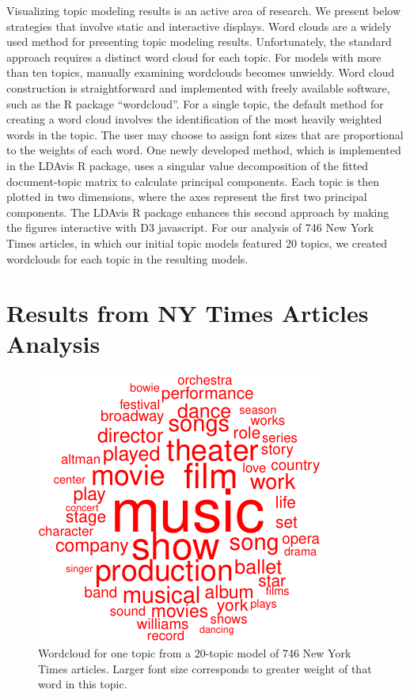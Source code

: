\documentclass[12pt,]{article}
\begin{document}
Visualizing topic modeling results is an active area of research. We
present below strategies that involve static and interactive displays.
Word clouds are a widely used method for presenting topic modeling
results. Unfortunately, the standard approach requires a distinct word
cloud for each topic. For models with more than ten topics, manually
examining wordclouds becomes unwieldy. Word cloud construction is
straightforward and implemented with freely available software, such as
the R package ``wordcloud''. For a single topic, the default method for
creating a word cloud involves the identification of the most heavily
weighted words in the topic. The user may choose to assign font sizes
that are proportional to the weights of each word. One newly developed
method, which is implemented in the LDAvis R package, uses a singular
value decomposition of the fitted document-topic matrix to calculate
principal components. Each topic is then plotted in two dimensions,
where the axes represent the first two principal components. The LDAvis
R package enhances this second approach by making the figures
interactive with D3 javascript. For our analysis of 746 New York Times
articles, in which our initial topic models featured 20 topics, we
created wordclouds for each topic in the resulting models.

\section{Results from NY Times Articles
Analysis}\label{results-from-ny-times-articles-analysis}

\begin{figure}
\includegraphics[width=\textwidth]{lda-tutorial-2016_files/figure-latex/wordcloud1-1.pdf}
\caption{Wordcloud for one topic from a 20-topic model of 746 New York Times articles. Larger font size corresponds to greater weight of that word in this topic.\label{fig:wc1}}
\end{figure}
\end{document}
